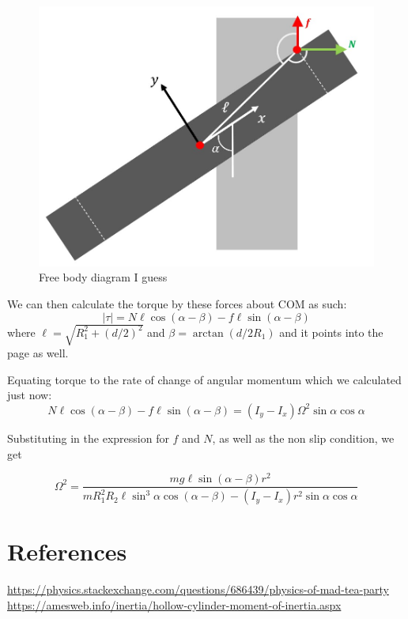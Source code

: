 \documentclass{scrartcl}
\begin{document}
\begin{figure}[h]
    \centering
    \includegraphics[scale=0.4]{diagram4.jpg}
    \caption{Free body diagram I guess}
    \label{4}
\end{figure}

We can then calculate the torque by these forces about COM as such:
\begin{equation}
    \left|\tau\right| =N\ell\cos(\alpha-\beta)- f\ell\sin(\alpha-\beta)
\end{equation}
where $\ell=\sqrt{R_1^2+(d/2)^2}$ and $\beta=\arctan(d/2R_1)$  and it points into the page as well.

Equating torque to the rate of change of angular momentum which we calculated just now:
\begin{equation}
    N\ell\cos(\alpha-\beta)- f\ell\sin(\alpha-\beta)= (I_y-I_x)\Omega^2 \sin\alpha\cos\alpha
\end{equation}

Substituting in the expression for $f$ and $N$, as well as the non slip condition, we get

\begin{equation}
    \boxed{
        \Omega^2=\frac{mg\ell\sin(\alpha-\beta)r^2}{mR_1^2R_2\ell\sin^3\alpha\cos(\alpha-\beta)-(I_y-I_x)r^2\sin\alpha\cos\alpha}}
\end{equation}

\section{References}
\href{https://physics.stackexchange.com/questions/686439/physics-of-mad-tea-party}{https://physics.stackexchange.com/questions/686439/physics-of-mad-tea-party}
\newline
\href{https://amesweb.info/inertia/hollow-cylinder-moment-of-inertia.aspx}{https://amesweb.info/inertia/hollow-cylinder-moment-of-inertia.aspx}
\end{document}
